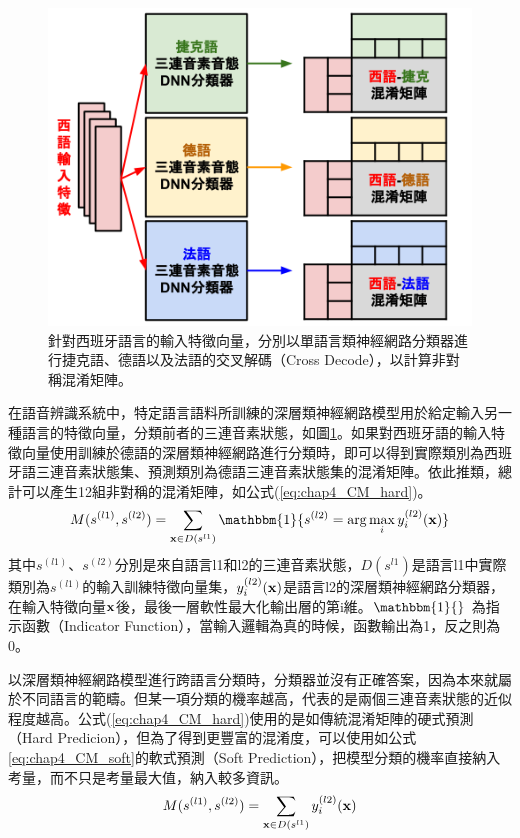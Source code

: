 \begin{figure}[!h]
\centering
\includegraphics[scale=0.4]{images/chap4_cross_decode.png}
\caption{針對西班牙語言的輸入特徵向量，分別以單語言類神經網路分類器進行捷克語、德語以及法語的交叉解碼（Cross Decode），以計算非對稱混淆矩陣。}
\label{fig:chap4_cross_decode}
\end{figure}

在語音辨識系統中，特定語言語料所訓練的深層類神經網路模型用於給定輸入另一種語言的特徵向量，分類前者的三連音素狀態，如圖\ref{fig:chap4_cross_decode}。如果對西班牙語的輸入特徵向量使用訓練於德語的深層類神經網路進行分類時，即可以得到實際類別為西班牙語三連音素狀態集、預測類別為德語三連音素狀態集的混淆矩陣。依此推類，總計可以產生12組非對稱的混淆矩陣，如公式(\ref{eq:chap4_CM_hard})。
\begin{equation} \label{eq:chap4_CM_hard}
M( s^{(l1)} , s^{(l2)} ) = \sum_{ \bold{x} \in D(s^{l1}) } \mathbbm{1} \{ s^{(l2)} = \arg\max_{i} y_{i}^{(l2)}(\bold{x}) \}
\end{equation}
其中$s^{(l1)}$、$s^{(l2)}$分別是來自語言l1和l2的三連音素狀態，$D(s^{l1})$是語言l1中實際類別為$s^{(l1)}$的輸入訓練特徵向量集，$y_{i}^{(l2)}(\bold{x})$是語言l2的深層類神經網路分類器，在輸入特徵向量$\bold{x}$後，最後一層軟性最大化輸出層的第i維。$\mathbbm{1}\{ \}$ 為指示函數（Indicator Function），當輸入邏輯為真的時候，函數輸出為1，反之則為0。

以深層類神經網路模型進行跨語言分類時，分類器並沒有正確答案，因為本來就屬於不同語言的範疇。但某一項分類的機率越高，代表的是兩個三連音素狀態的近似程度越高。公式(\ref{eq:chap4_CM_hard})使用的是如傳統混淆矩陣的硬式預測（Hard Predicion），但為了得到更豐富的混淆度，可以使用如公式\ref{eq:chap4_CM_soft}的軟式預測（Soft Prediction），把模型分類的機率直接納入考量，而不只是考量最大值，納入較多資訊。
\begin{equation} \label{eq:chap4_CM_soft}
M( s^{(l1)} , s^{(l2)} ) = \sum_{ \bold{x} \in D(s^{l1}) } y_{i}^{(l2)}(\bold{x}) 
\end{equation}

